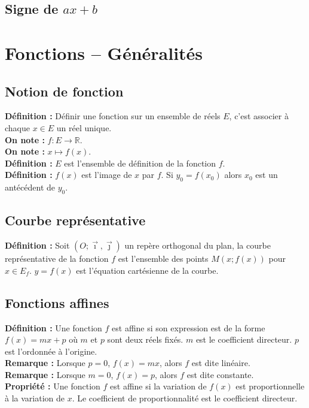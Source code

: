\documentclass[a4paper,titlepage]{article}
\makeatletter
\let\oldsection\section
\renewcommand\section{\clearpage\oldsection}
\def\tikzscale{1}\begin{lrbox}{\measure@tikzpicture}
\edef\tikzscale{\pgfmathresult}
\makeatother
\begin{document}
    \subsection[Signe de $ax+b$]{\boldmath Signe de $ax+b$}
        \begin{scaletikzpicturetowidth}{\textwidth}
        \end{scaletikzpicturetowidth}
\section{Fonctions – Généralités}
    \subsection{Notion de fonction}
        \textbf{Définition :} Définir une fonction sur un ensemble de réels $E$, c’est associer à chaque $x\in E$ un réel unique.
        \\
        \textbf{On note :} $f:E\rightarrow\mathbb{R}$.
        \\
        \textbf{On note :} $x\mapsto f\left(x\right)$.
        \\
        \textbf{Définition :} $E$ est l’ensemble de définition de la fonction $f$.
        \\
        \textbf{Définition :} $f\left(x\right)$ est l’image de $x$ par $f$. Si $y_{0}=f\left(x_{0}\right)$ alors $x_{0}$ est un antécédent de $y_{0}$.
    \subsection{Courbe représentative}
        \textbf{Définition :} Soit $\left(O;\vec{\imath},\vec{\jmath}\right)$ un repère orthogonal du plan, la courbe re\-pré\-sen\-ta\-tive de la fonction $f$ est l’ensemble des points $M\left(x;f\left(x\right)\right)$ pour $x\in E_{f}$. $y=f\left(x\right)$ est l’équation cartésienne de la courbe.
    \subsection{Fonctions affines}
        \textbf{Définition :} Une fonction $f$ est affine si son expression est de la forme $f\left(x\right)=mx+p$ où $m$ et $p$ sont deux réels fixés. $m$ est le coefficient directeur. $p$ est l’ordonnée à l’origine.
        \\
        \textbf{Remarque :} Lorsque $p=0$, $f\left(x\right)=mx$, alors $f$ est dite linéaire.
        \\
        \textbf{Remarque :} Lorsque $m=0$, $f\left(x\right)=p$, alors $f$ est dite constante.
        \\
        \textbf{Propriété :} Une fonction $f$ est affine si la variation de $f\left(x\right)$ est proportionnelle à la variation de $x$. Le coefficient de proportionnalité est le coefficient directeur.
\end{document}
